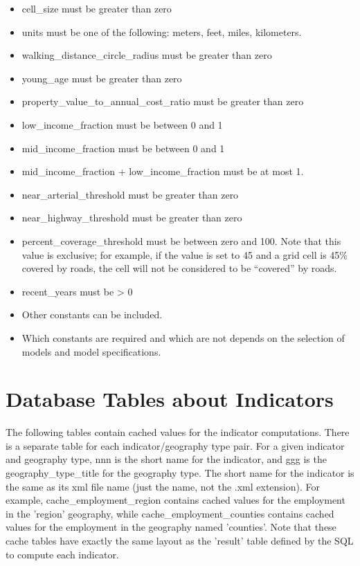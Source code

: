 \begin{itemize} \tight
\item cell_size must be greater than zero
\item units must be one of the following: meters, feet, miles, kilometers.
\item walking_distance_circle_radius must be greater than zero
\item young_age must be greater than zero
\item property_value_to_annual_cost_ratio must be greater than zero
\item low_income_fraction must be between 0 and 1
\item mid_income_fraction must be between 0 and 1
\item mid_income_fraction + low_income_fraction must be at most 1.
\item near_arterial_threshold must be greater than zero
\item near_highway_threshold must be greater than zero
\item percent_coverage_threshold must be between zero and 100. Note that this value is exclusive; for example, if the value is set to 45 and a grid cell is 45\% covered by roads, the cell will not be considered to be ``covered'' by roads.
\item recent_years must be \textgreater{} 0
\item Other constants can be included.
\item Which constants are required and which are not depends on the selection of models and model specifications.
\end{itemize}

\section{Database Tables about Indicators}


The following tables contain cached values for the indicator computations.
There is a separate table for each indicator/geography type pair. For a given
indicator and geography type, nnn is the short name for the indicator, and ggg
is the geography_type_title for the geography type. The short name for the
indicator is the same as its xml file name (just the name, not the .xml
extension). For example, cache_employment_region contains cached values for the
employment in the 'region' geography, while cache_employment_counties contains
cached values for the employment in the geography named 'counties'. Note that
these cache tables have exactly the same layout as the 'result' table defined
by the SQL to compute each indicator.

